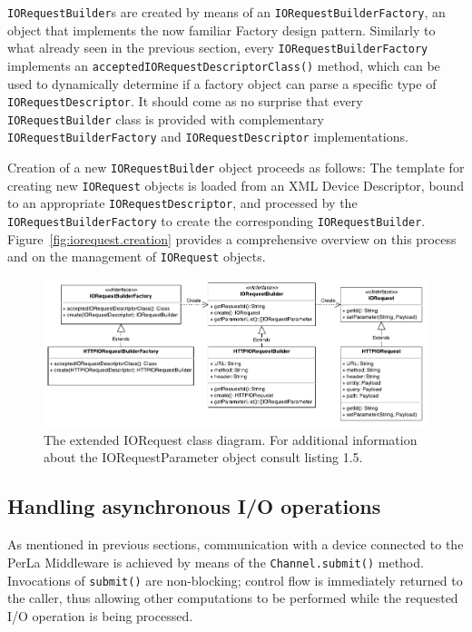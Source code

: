 \texttt{IORequestBuilder}s are created by means of an \texttt{IORequestBuilderFactory}, an object that implements the now familiar Factory design pattern. Similarly to what already seen in the previous section, every \texttt{IORequestBuilderFactory} implements an \texttt{acceptedIORequestDescriptorClass()} method, which can be used to dynamically determine if a factory object can parse a specific type of \texttt{IORequestDescriptor}.   It should come as no surprise that every \texttt{IORequestBuilder} class is provided with complementary \texttt{IORequestBuilderFactory} and \texttt{IORequestDescriptor} implementations.

Creation of a new \texttt{IORequestBuilder} object proceeds as follows: The template for creating new \texttt{IORequest} objects is loaded from an XML Device Descriptor, bound to an appropriate \texttt{IORequestDescriptor}, and processed by the \texttt{IORequestBuilderFactory} to create the corresponding \texttt{IORequestBuilder}. Figure~\ref{fig:iorequest.creation} provides a comprehensive overview on this process and on the management of \texttt{IORequest} objects.

\begin{figure}[!hbt]
\includegraphics[width=\textwidth]{imgs/iorequest.pdf}
\caption{The extended IORequest class diagram. For additional information about the IORequestParameter object consult listing 1.5.}
\label{fig:iorequest.class}
\end{figure}


\subsection{Handling asynchronous I/O operations}

As mentioned in previous sections, communication with a device connected to the PerLa Middleware is achieved by means of the \texttt{Channel.submit()} method. Invocations of \texttt{submit()} are non-blocking; control flow is immediately returned to the caller, thus allowing other computations to be performed while the requested I/O operation is being processed.

